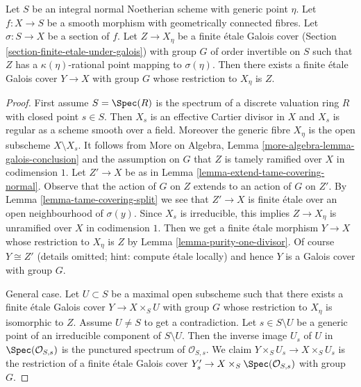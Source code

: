 \begin{lemma}
\label{lemma-extend-covering}
Let $S$ be an integral normal Noetherian scheme with generic point $\eta$.
Let $f : X \to S$ be a smooth morphism with geometrically connected fibres.
Let $\sigma : S \to X$ be a section of $f$. Let $Z \to X_\eta$ be a
finite \'etale Galois cover (Section \ref{section-finite-etale-under-galois})
with group $G$ of order invertible on $S$ such that
$Z$ has a $\kappa(\eta)$-rational point mapping to $\sigma(\eta)$.
Then there exists a finite \'etale Galois cover $Y \to X$ with group $G$
whose restriction to $X_\eta$ is $Z$.
\end{lemma}

\begin{proof}
First assume $S = \Spec(R)$ is the spectrum of a discrete valuation ring $R$
with closed point $s \in S$. Then $X_s$ is an effective Cartier
divisor in $X$ and $X_s$ is regular as a scheme smooth over a field.
Moreover the generic fibre $X_\eta$ is the open subscheme $X \setminus X_s$.
It follows from
More on Algebra, Lemma \ref{more-algebra-lemma-galois-conclusion}
and the assumption on $G$ that $Z$ is tamely ramified
over $X$ in codimension $1$. Let $Z' \to X$ be as in
Lemma \ref{lemma-extend-tame-covering-normal}. Observe that
the action of $G$ on $Z$ extends to an action of $G$ on $Z'$.
By Lemma \ref{lemma-tame-covering-split}
we see that $Z' \to X$ is finite \'etale over an open
neighbourhood of $\sigma(y)$.
Since $X_s$ is irreducible, this implies $Z \to X_\eta$
is unramified over $X$ in codimension $1$.
Then we get a finite \'etale morphism $Y \to X$
whose restriction to $X_\eta$ is $Z$ by
Lemma \ref{lemma-purity-one-divisor}.
Of course $Y \cong Z'$ (details omitted; hint: compute \'etale locally)
and hence $Y$ is a Galois cover with group $G$.

\medskip\noindent
General case. Let $U \subset S$ be a maximal open subscheme
such that there exists a finite \'etale Galois cover
$Y \to X \times_S U$ with group $G$
whose restriction to $X_\eta$ is isomorphic to $Z$.
Assume $U \not = S$ to get a contradiction.
Let $s \in S \setminus U$ be a generic point of an irreducible
component of $S \setminus U$. Then the inverse image $U_s$
of $U$ in $\Spec(\mathcal{O}_{S, s})$
is the punctured spectrum of $\mathcal{O}_{S, s}$.
We claim $Y \times_S U_s \to X \times_S U_s$
is the restriction of a finite \'etale Galois cover
$Y'_s \to X \times_S \Spec(\mathcal{O}_{S, s})$
with group $G$.


\end{proof}
